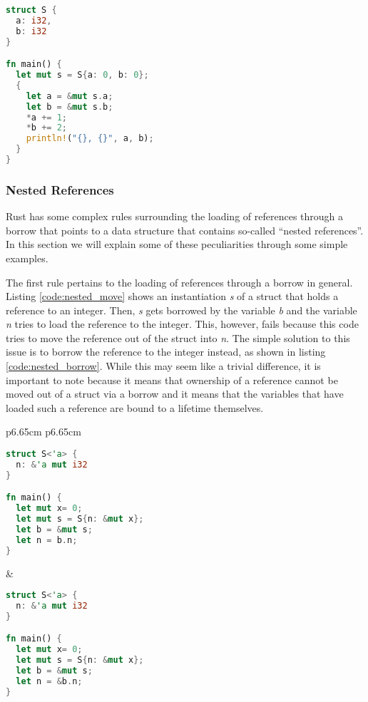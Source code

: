 \begin{lstlisting}[language=Rust,frame=single,caption=Borrowing struct fields,label=code:struct_semantics]
struct S {
  a: i32,
  b: i32
}

fn main() {
  let mut s = S{a: 0, b: 0};
  {
    let a = &mut s.a;
    let b = &mut s.b;
    *a += 1;
    *b += 2;
    println!("{}, {}", a, b);
  }
}
\end{lstlisting}

\subsubsection{Nested References}
Rust has some complex rules surrounding the loading of references through a borrow that points to a data structure that contains so-called ``nested references''.
In this section we will explain some of these peculiarities through some simple examples.

The first rule pertains to the loading of references through a borrow in general.
Listing \ref{code:nested_move} shows an instantiation \textit{s} of a struct that holds a reference to an integer.
Then, \textit{s} gets borrowed by the variable \textit{b} and the variable \textit{n} tries to load the reference to the integer.
This, however, fails because this code tries to move the reference out of the struct into \textit{n}.
The simple solution to this issue is to borrow the reference to the integer instead, as shown in listing \ref{code:nested_borrow}.
While this may seem like a trivial difference, it is important to note because it means that ownership of a reference cannot be moved out of a struct via a borrow and it means that the variables that have loaded such a reference are bound to a lifetime themselves.
\begin{tabular}{p{6.65cm} p{6.65cm}}
    \begin{lstlisting}[language=Rust,frame=single,caption=Move reference,label=code:nested_move]
struct S<'a> {
  n: &'a mut i32
}

fn main() {
  let mut x= 0;
  let mut s = S{n: &mut x};
  let b = &mut s;
  let n = b.n;
}
    \end{lstlisting}

    &

    \begin{lstlisting}[language=Rust,frame=single,caption=Borrow reference,label=code:nested_borrow]
struct S<'a> {
  n: &'a mut i32
}

fn main() {
  let mut x= 0;
  let mut s = S{n: &mut x};
  let b = &mut s;
  let n = &b.n;
}
    \end{lstlisting}
\end{tabular}

